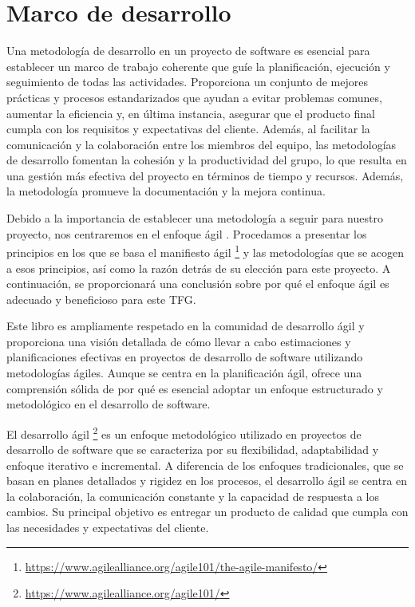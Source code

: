\section{Marco de desarrollo}

Una metodología de desarrollo en un proyecto de software es esencial para establecer un marco de trabajo coherente que guíe la planificación, ejecución y seguimiento de todas las actividades. Proporciona un conjunto de mejores prácticas y procesos estandarizados que ayudan a evitar problemas comunes, aumentar la eficiencia y, en última instancia, asegurar que el producto final cumpla con los requisitos y expectativas del cliente. Además, al facilitar la comunicación y la colaboración entre los miembros del equipo, las metodologías de desarrollo fomentan la cohesión y la productividad del grupo, lo que resulta en una gestión más efectiva del proyecto en términos de tiempo y recursos. Además, la metodología promueve la documentación y la mejora continua.

Debido a la importancia de establecer una metodología a seguir para nuestro proyecto, nos centraremos en el enfoque ágil \cite{WhyAgile}. Procedamos a presentar los principios en los que se basa el manifiesto ágil \footnote{\url{https://www.agilealliance.org/agile101/the-agile-manifesto/}} y las metodologías que se acogen a esos principios, así como la razón detrás de su elección para este proyecto. A continuación, se proporcionará una conclusión sobre por qué el enfoque ágil es adecuado y beneficioso para este TFG.

Este libro\cite{MetodDesa} es ampliamente respetado en la comunidad de desarrollo ágil y proporciona una visión detallada de cómo llevar a cabo estimaciones y planificaciones efectivas en proyectos de desarrollo de software utilizando metodologías ágiles. Aunque se centra en la planificación ágil, ofrece una comprensión sólida de por qué es esencial adoptar un enfoque estructurado y metodológico en el desarrollo de software.

El desarrollo ágil \footnote{\url{https://www.agilealliance.org/agile101/}} es un enfoque metodológico utilizado en proyectos de desarrollo de software que se caracteriza por su flexibilidad, adaptabilidad y enfoque iterativo e incremental. A diferencia de los enfoques tradicionales, que se basan en planes detallados y rigidez en los procesos, el desarrollo ágil se centra en la colaboración, la comunicación constante y la capacidad de respuesta a los cambios. Su principal objetivo es entregar un producto de calidad que cumpla con las necesidades y expectativas del cliente.

